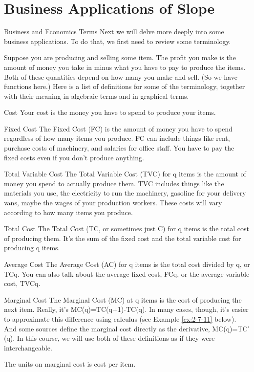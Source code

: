 \section{Business Applications of Slope}
\label{sec:basic-apps}

Business and Economics Terms
Next we will delve more deeply into some business applications. To do that, we first need to review some terminology.

Suppose you are producing and selling some item. The profit you make is the amount of money you take in minus what you have to pay to produce the items. Both of these quantities depend on how many you make and sell. (So we have functions here.) Here is a list of definitions for some of the terminology, together with their meaning in algebraic terms and in graphical terms.

Cost
Your cost is the money you have to spend to produce your items.

Fixed Cost
The Fixed Cost (FC) is the amount of money you have to spend regardless of how many items you produce. FC can include things like rent, purchase costs of machinery, and salaries for office staff. You have to pay the fixed costs even if you don’t produce anything.

Total Variable Cost
The Total Variable Cost (TVC) for q items is the amount of money you spend to actually produce them. TVC includes things like the materials you use, the electricity to run the machinery, gasoline for your delivery vans, maybe the wages of your production workers. These costs will vary according to how many items you produce.

Total Cost
The Total Cost (TC, or sometimes just C) for q items is the total cost of producing them. It’s the sum of the fixed cost and the total variable cost for producing q items.

Average Cost
The Average Cost (AC) for q items is the total cost divided by q, or TCq. You can also talk about the average fixed cost, FCq, or the average variable cost, TVCq.

Marginal Cost
The Marginal Cost (MC) at q items is the cost of producing the next item. Really, it’s
MC(q)=TC(q+1)-TC(q).
In many cases, though, it’s easier to approximate this difference using calculus (see Example \ref{ex:2-7-11} below). And some sources define the marginal cost directly as the derivative,
MC(q)=TC′(q).
In this course, we will use both of these definitions as if they were interchangeable.

The units on marginal cost is cost per item.

